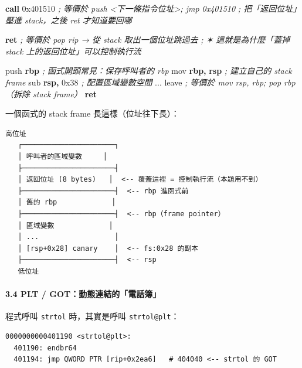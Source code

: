 \documentclass[10pt,a4paper]{article}
\newenvironment{Shaded}{\begin{snugshade}}{\end{snugshade}}
\newcommand{\BaseNTok}[1]{\textcolor[rgb]{0.00,0.00,0.81}{#1}}
\newcommand{\BuiltInTok}[1]{#1}
\newcommand{\CommentTok}[1]{\textcolor[rgb]{0.56,0.35,0.01}{\textit{#1}}}
\newcommand{\ControlFlowTok}[1]{\textcolor[rgb]{0.13,0.29,0.53}{\textbf{#1}}}
\newcommand{\KeywordTok}[1]{\textcolor[rgb]{0.13,0.29,0.53}{\textbf{#1}}}
\newcommand{\NormalTok}[1]{#1}
\newcommand{\OperatorTok}[1]{\textcolor[rgb]{0.81,0.36,0.00}{\textbf{#1}}}
\renewenvironment{Shaded}{%
  \def\FrameCommand{\fboxsep=3.2pt\colorbox{shadecolor}}%
  \MakeFramed{\advance\hsize-\width\FrameRestore\small}%
}{%
  \endMakeFramed
}
\begin{document}
\begin{Shaded}
\begin{Highlighting}[]
\ControlFlowTok{call} \BaseNTok{0x401510}     \CommentTok{; 等價於 push \textless{}下一條指令位址\textgreater{}; jmp 0x401510}
                  \CommentTok{; 把「返回位址」壓進 stack，之後 ret 才知道要回哪}

\ControlFlowTok{ret}               \CommentTok{; 等價於 pop rip  → 從 stack 取出一個位址跳過去}
                  \CommentTok{; ✶ 這就是為什麼「蓋掉 stack 上的返回位址」可以控制執行流}

\BuiltInTok{push} \KeywordTok{rbp}          \CommentTok{; 函式開頭常見：保存呼叫者的 rbp}
\BuiltInTok{mov}  \KeywordTok{rbp}\OperatorTok{,} \KeywordTok{rsp}     \CommentTok{; 建立自己的 stack frame}
\BuiltInTok{sub}  \KeywordTok{rsp}\OperatorTok{,} \BaseNTok{0x38}    \CommentTok{; 配置區域變數空間}
\NormalTok{...}
\BuiltInTok{leave}             \CommentTok{; 等價於 mov rsp, rbp; pop rbp  （拆除 stack frame）}
\ControlFlowTok{ret}
\end{Highlighting}
\end{Shaded}

一個函式的 stack frame 長這樣（位址往下長）：

\begin{Verbatim}[breaklines=true,breakanywhere=true,breakautoindent=false,fontsize=\fontsize{7.0}{9.5}\selectfont]
   高位址
   ┌──────────────────────┐
   │ 呼叫者的區域變數     │
   ├──────────────────────┤
   │ 返回位址 (8 bytes)   │  <-- 覆蓋這裡 = 控制執行流（本題用不到）
   ├──────────────────────┤  <-- rbp 進函式前
   │ 舊的 rbp             │
   ├──────────────────────┤  <-- rbp（frame pointer）
   │ 區域變數             │
   │ ...                  │
   │ [rsp+0x28] canary    │  <-- fs:0x28 的副本
   ├──────────────────────┤  <-- rsp
   低位址
\end{Verbatim}

\paragraph{3.4 PLT /
GOT：動態連結的「電話簿」}\label{plt-gotux52d5ux614bux9023ux7d50ux7684ux96fbux8a71ux7c3f}

程式呼叫 \texttt{strtol} 時，其實是呼叫 \texttt{strtol@plt}：

\begin{Verbatim}[breaklines=true,breakanywhere=true,breakautoindent=false,fontsize=\fontsize{7.0}{9.5}\selectfont]
0000000000401190 <strtol@plt>:
  401190: endbr64
  401194: jmp QWORD PTR [rip+0x2ea6]   # 404040 <-- strtol 的 GOT
\end{Verbatim}
\end{document}
